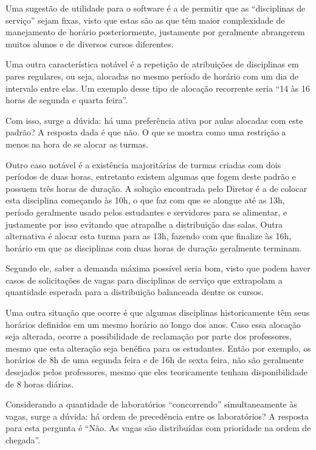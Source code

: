 Uma sugestão de utilidade para o software é a de permitir que as ``disciplinas de serviço'' sejam fixas, visto que estas são as que têm maior complexidade de manejamento de horário posteriormente, justamente por geralmente abrangerem muitos alunos e de diversos cursos diferentes.

Uma outra característica notável é a repetição de atribuições de disciplinas em pares regulares, ou seja, alocadas no mesmo período de horário com um dia de intervalo entre elas. Um exemplo desse tipo de alocação recorrente seria ``14 às 16 horas de segunda e quarta feira''.

Com isso, surge a dúvida: há uma preferência ativa por aulas alocadas com este padrão? A resposta dada é que não. O que se mostra como uma restrição a menos na hora de se alocar as turmas.

Outro caso notável é a existência majoritárias de turmas criadas com dois períodos de duas horas, entretanto existem algumas que fogem deste padrão e possuem três horas de duração. A solução encontrada pelo Diretor é a de colocar esta disciplina começando às 10h, o que faz com que se alongue até as 13h, período geralmente usado pelos estudantes e servidores para se alimentar, e justamente por isso evitando que atrapalhe a distribuição das salas. Outra alternativa é alocar esta turma para as 13h, fazendo com que finalize às 16h, horário em que as disciplinas com duas horas de duração geralmente terminam.

Segundo ele, saber a demanda máxima possível seria bom, visto que podem haver casos de solicitações de vagas para disciplinas de serviço que extrapolam a quantidade esperada para a distribuição balanceada dentre os cursos.

Uma outra situação que ocorre é que algumas disciplinas historicamente têm seus horários definidos em um mesmo horário ao longo dos anos. Caso essa alocação seja alterada, ocorre a possibilidade de reclamação por parte dos professores, mesmo que esta alteração seja benéfica para os estudantes. Então por exemplo, os horários de 8h de uma segunda feira e de 16h de sexta feira, não são geralmente desejados pelos professores, mesmo que eles teoricamente tenham disponibilidade de 8 horas diárias.

Considerando a quantidade de laboratórios ``concorrendo'' simultaneamente às vagas, surge a dúvida: há ordem de precedência entre os laboratórios? A resposta para esta pergunta é ``Não. As vagas são distribuídas com prioridade na ordem de chegada''.

